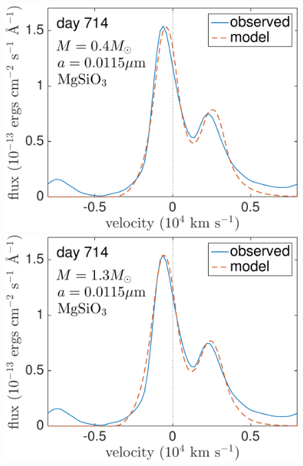 \begin{figure}
\includegraphics[trim =0 30 -5 0,clip=true,scale=0.325]{chapters/chapter5/images/silicates_take2/OI/MgSiO3_Dwek.pdf}
\hspace{3mm}
\includegraphics[trim =0 30 -25 -25,clip=true,scale=0.325]{chapters/chapter5/images/silicates_take2/OI/MgSiO3_bestfit.pdf}


\end{figure}
